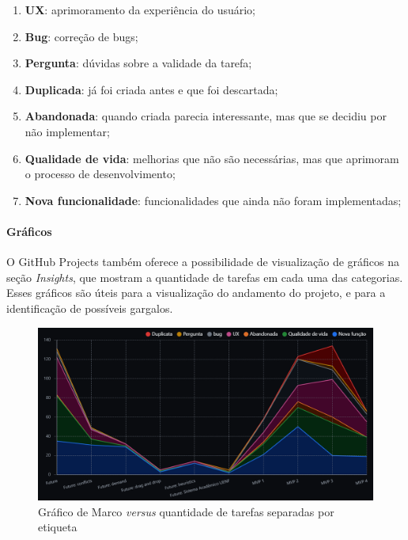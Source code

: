 \begin{enumerate}
  \item \textbf{UX}: aprimoramento da experiência do usuário;
  \item \textbf{Bug}: correção de bugs;
  \item \textbf{Pergunta}: dúvidas sobre a validade da tarefa;
  \item \textbf{Duplicada}: já foi criada antes e que foi descartada;
  \item \textbf{Abandonada}: quando criada parecia interessante, mas que se decidiu por não implementar;
  \item \textbf{Qualidade de vida}: melhorias que não são necessárias, mas que aprimoram o processo de desenvolvimento;
  \item \textbf{Nova funcionalidade}: funcionalidades que ainda não foram implementadas;
\end{enumerate}

\paragraph*{Gráficos}

O GitHub Projects também oferece a possibilidade de visualização de gráficos na seção \textit{Insights}, que mostram a quantidade de tarefas em cada uma das categorias. Esses gráficos são úteis para a visualização do andamento do projeto, e para a identificação de possíveis gargalos.

\begin{figure}[htbp]
  \centering
  \caption{Gráfico de Marco \textit{versus} quantidade de tarefas separadas por etiqueta\label{fig:ProjectsInsights}}
  \includegraphics[scale=0.6]{files/img/Codificacao/GitHubProjects - Insights - Stacked Line Milestone_Label.png}
  \legend{\selfAuthor}
\end{figure}

